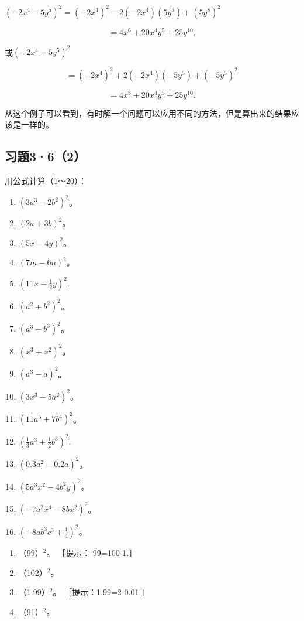 \((-2x^{4} - 5y^{5})^{2} = (-2x^{4})^{2} - 2(-2x^{4})(5y^{5}) + (5y^{8})^{2}\)

\[
= 4 x ^{6} + 20 x ^{4} y ^{5} + 25 y ^{10}.
\]

或\((-2x^{4} - 5y^{5})^{2}\)

\[
= (- 2 x ^{4}) ^{2} + 2 (- 2 x ^{4}) (- 5 y ^{5}) + (- 5 y ^{5}) ^{2}
\]

\[
= 4 x ^{8} + 20 x ^{4} y ^{5} + 25 y ^{10}.
\]

从这个例子可以看到，有时解一个问题可以应用不同的方法，但是算出来的结果应该是一样的。

\subsection{习题3·6（2）}

用公式计算（1～20）：

\begin{enumerate}[start=1]
\item
  \((3a^{3} - 2b^{2})^{2}\)。
\item
  \((2a + 3b)^{2}\)。
\item
  \((5x - 4y)^{2}\)。
\item
  \((7m - 6n)^{2}\)。
\item
  \(\left(11x - \frac{1}{2} y\right)^2.\)
\item
  \((a^2 + b^2)^2\)。
\item
  \((a^3 - b^3)^2\)。
\item
  \((x^{3} + x^{2})^{2}\)。
\item
  \((a^3 - a)^2\)。
\item
  \((3x^{3} - 5a^{2})^{2}\)。
\item
  \((11a^{5} + 7b^{4})^{2}\)。
\item
  \(\left(\frac{1}{3} a^3 +\frac{1}{2} b^3\right)^2.\)
\item
  \((0.3a^{2} - 0.2a)^{2}\)。
\item
  \((5a^{3}x^{2} - 4b^{2}y)^{2}\)。
\item
  \((-7a^{2}x^{4} - 8bx^{2})^{2}\)。
\item
  \(\left(-8ab^{3}c^{3} + \frac{1}{4}\right)^{2}\)。
\end{enumerate}

\begin{enumerate}[start=17]
\item
  （99）\(^{2}\)。 ［提示： 99=100-1.］
\item
  （102）\(^{2}\)。
\item
  （1.99）\(^{2}\)。 ［提示：1.99=2-0.01.］
\item
  （91）\(^{2}\)。
\end{enumerate}

